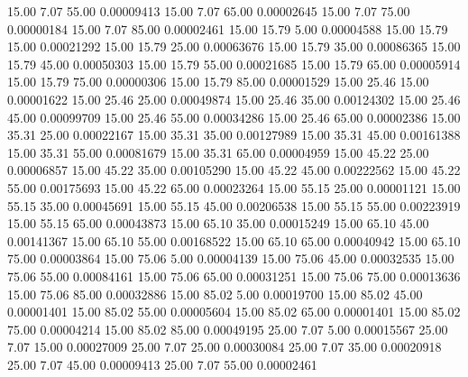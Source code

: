      15.00      7.07     55.00     0.00009413
     15.00      7.07     65.00     0.00002645
     15.00      7.07     75.00     0.00000184
     15.00      7.07     85.00     0.00002461
     15.00     15.79      5.00     0.00004588
     15.00     15.79     15.00     0.00021292
     15.00     15.79     25.00     0.00063676
     15.00     15.79     35.00     0.00086365
     15.00     15.79     45.00     0.00050303
     15.00     15.79     55.00     0.00021685
     15.00     15.79     65.00     0.00005914
     15.00     15.79     75.00     0.00000306
     15.00     15.79     85.00     0.00001529
     15.00     25.46     15.00     0.00001622
     15.00     25.46     25.00     0.00049874
     15.00     25.46     35.00     0.00124302
     15.00     25.46     45.00     0.00099709
     15.00     25.46     55.00     0.00034286
     15.00     25.46     65.00     0.00002386
     15.00     35.31     25.00     0.00022167
     15.00     35.31     35.00     0.00127989
     15.00     35.31     45.00     0.00161388
     15.00     35.31     55.00     0.00081679
     15.00     35.31     65.00     0.00004959
     15.00     45.22     25.00     0.00006857
     15.00     45.22     35.00     0.00105290
     15.00     45.22     45.00     0.00222562
     15.00     45.22     55.00     0.00175693
     15.00     45.22     65.00     0.00023264
     15.00     55.15     25.00     0.00001121
     15.00     55.15     35.00     0.00045691
     15.00     55.15     45.00     0.00206538
     15.00     55.15     55.00     0.00223919
     15.00     55.15     65.00     0.00043873
     15.00     65.10     35.00     0.00015249
     15.00     65.10     45.00     0.00141367
     15.00     65.10     55.00     0.00168522
     15.00     65.10     65.00     0.00040942
     15.00     65.10     75.00     0.00003864
     15.00     75.06      5.00     0.00004139
     15.00     75.06     45.00     0.00032535
     15.00     75.06     55.00     0.00084161
     15.00     75.06     65.00     0.00031251
     15.00     75.06     75.00     0.00013636
     15.00     75.06     85.00     0.00032886
     15.00     85.02      5.00     0.00019700
     15.00     85.02     45.00     0.00001401
     15.00     85.02     55.00     0.00005604
     15.00     85.02     65.00     0.00001401
     15.00     85.02     75.00     0.00004214
     15.00     85.02     85.00     0.00049195
     25.00      7.07      5.00     0.00015567
     25.00      7.07     15.00     0.00027009
     25.00      7.07     25.00     0.00030084
     25.00      7.07     35.00     0.00020918
     25.00      7.07     45.00     0.00009413
     25.00      7.07     55.00     0.00002461
